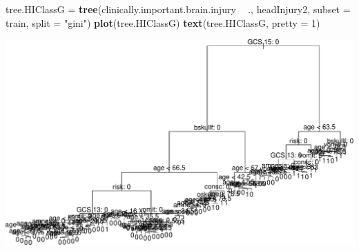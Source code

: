 \documentclass[ignorenonframetext,]{beamer}
\newenvironment{Shaded}{\begin{snugshade}}{\end{snugshade}}
\newcommand{\KeywordTok}[1]{\textcolor[rgb]{0.13,0.29,0.53}{\textbf{#1}}}
\newcommand{\DataTypeTok}[1]{\textcolor[rgb]{0.13,0.29,0.53}{#1}}
\newcommand{\DecValTok}[1]{\textcolor[rgb]{0.00,0.00,0.81}{#1}}
\newcommand{\StringTok}[1]{\textcolor[rgb]{0.31,0.60,0.02}{#1}}
\newcommand{\OperatorTok}[1]{\textcolor[rgb]{0.81,0.36,0.00}{\textbf{#1}}}
\newcommand{\NormalTok}[1]{#1}
\begin{document}
\begin{frame}[fragile]

\begin{Shaded}
\begin{Highlighting}[]
\NormalTok{tree.HIClassG =}\StringTok{ }\KeywordTok{tree}\NormalTok{(clinically.important.brain.injury }\OperatorTok{~}\StringTok{ }\NormalTok{., headInjury2, }
    \DataTypeTok{subset =}\NormalTok{ train, }\DataTypeTok{split =} \StringTok{"gini"}\NormalTok{)}
\KeywordTok{plot}\NormalTok{(tree.HIClassG)}
\KeywordTok{text}\NormalTok{(tree.HIClassG, }\DataTypeTok{pretty =} \DecValTok{1}\NormalTok{)}
\end{Highlighting}
\end{Shaded}

\includegraphics{8TreesBEAMER_files/figure-beamer/unnamed-chunk-15-1.pdf}

\end{frame}
\end{document}
